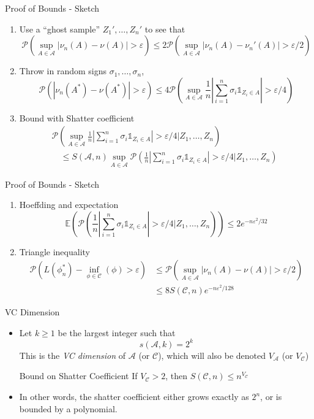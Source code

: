 \documentclass{beamer}
\renewcommand{\Pr}[1]{\mathcal{P} \left( #1 \right)}
\newcommand{\cls}{\mathcal{C}}
\newcommand{\E}[1]{\mathbb{E}\left( #1 \right)}
\newcommand{\abs}[1]{\left| #1 \right|}
\newcommand{\eps}{\varepsilon}
\begin{document}
\begin{frame}{Proof of Bounds - Sketch}
\begin{enumerate}
\item Use a ``ghost sample'' $Z_1', \ldots, Z_n'$ to see that
\[ \Pr{ \sup_{A \in \mathcal{A}} \abs{\nu_n(A) - \nu(A)} > \eps} \leq 2\Pr{ \sup_{A \in \mathcal{A}} \abs{\nu_n(A) - \nu_n'(A)} > \eps/2}\]
\item Throw in random signs $\sigma_1,\ldots,\sigma_n$,
\[ \Pr{ \abs{\nu_n(A^*) - \nu(A^*)} > \eps} \leq 4 \Pr{\sup_{A\in\mathcal{A}} \frac1n\abs{\sum_{i=1}^n \sigma_i \mathds{1}_{Z_i \in A}} > \eps/4 }\]
\item Bound with Shatter coefficient
\begin{align*}
\Pr{\sup_{A\in\mathcal{A}} \frac1n\abs{\sum_{i=1}^n \sigma_i \mathds{1}_{Z_i \in A}} > \eps/4 \vert Z_1,\ldots, Z_n} \quad\quad\quad\quad\quad\quad\quad\\
\quad \leq S(\mathcal{A}, n)\sup_{A \in \mathcal{A}} \Pr{\frac1n \abs{\sum_{i=1}^n \sigma_i \mathds{1}_{Z_i \in A}} > \eps/4 \vert Z_1,\ldots,Z_n} \end{align*}
\end{enumerate}
\end{frame}

\begin{frame}{Proof of Bounds - Sketch}
\begin{enumerate}
\item Hoeffding and expectation
\[ \E{\Pr{\frac1n \abs{\sum_{i=1}^n \sigma_i \mathds{1}_{Z_i \in A}} > \eps/4 \vert Z_1,\ldots,Z_n}} \leq 2e^{-n\eps^2/32} \]
\item Triangle inequality
\begin{align*}
  \Pr{ L(\phi^*_n) - \inf_{\phi \in \cls}(\phi) > \eps} & \leq \Pr{ \sup_{A \in \mathcal{A}} \abs{\nu_n(A) - \nu(A)} > \eps/2} \\
	& \leq 8 S(\cls,n)e^{-n\eps^2/128}\end{align*}
\end{enumerate}
\end{frame}

\begin{frame}{VC Dimension}
\begin{itemize}
\item Let $k \geq 1$ be the largest integer such that
\[ s(\mathcal A, k) = 2^k \]
This is the \emph{VC dimension} of $\mathcal A$ (or $\cls$), which will also be denoted $V_{\mathcal A}$ (or $V_\cls$)
\begin{block}{Bound on Shatter Coefficient}
If $V_\cls > 2$, then $S(\cls, n) \leq n^{V_\cls}$
\end{block}
\item In other words, the shatter coefficient either grows exactly as $2^n$, or is bounded by a polynomial.
\end{itemize}
\end{frame}
\end{document}
